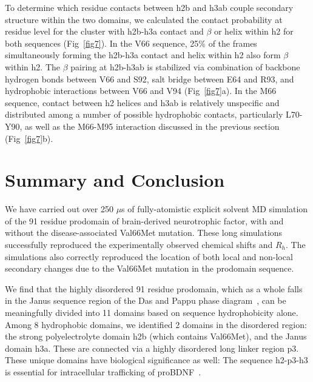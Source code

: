 \documentclass[10pt,letterpaper]{article}
\begin{document}

To determine which residue contacts between h2b and h3ab couple secondary structure within the two domains, we calculated the contact probability at residue level for the cluster with h2b-h3a contact and $\beta$ or helix within h2 for both sequences (Fig~\ref{fig7}). In the V66 sequence, 25\% of the frames simultaneously forming the h2b-h3a contact and helix within h2 also form $\beta$ within h2. The $\beta$ pairing at h2b-h3ab is stabilized via combination of backbone hydrogen bonds between V66 and S92, salt bridge between E64 and R93, and hydrophobic interactions between V66 and V94 (Fig~\ref{fig7}a). In the M66 sequence, contact between h2 helices and h3ab is relatively unspecific and distributed among a number of possible hydrophobic contacts, particularly L70-Y90, as well as the M66-M95 interaction discussed in the previous section (Fig~\ref{fig7}b).

\section*{Summary and Conclusion}

We have carried out over 250 $\mu$s of fully-atomistic explicit solvent MD simulation of the 91 residue prodomain of brain-derived neurotrophic factor, with and without the disease-associated Val66Met mutation. These long simulations successfully reproduced the experimentally observed chemical shifts and $R_h$. The simulations also correctly reproduced the location of both local and non-local secondary changes due to the Val66Met mutation in the prodomain sequence. 

We find that the highly disordered 91 residue prodomain, which as a whole falls in the Janus sequence region of the Das and Pappu phase diagram~\cite{Das2013a}, can be meaningfully divided into 11 domains based on sequence hydrophobicity alone. Among 8 hydrophobic domains, we identified 2 domains in the disordered region: the strong polyelectrolyte domain h2b (which contains Val66Met), and the Janus domain h3a. These are connected via a highly disordered long linker region p3. These unique domains have biological significance as well: The sequence h2-p3-h3 is essential for intracellular trafficking of proBDNF~\cite{Chen2005}. 
\end{document}
